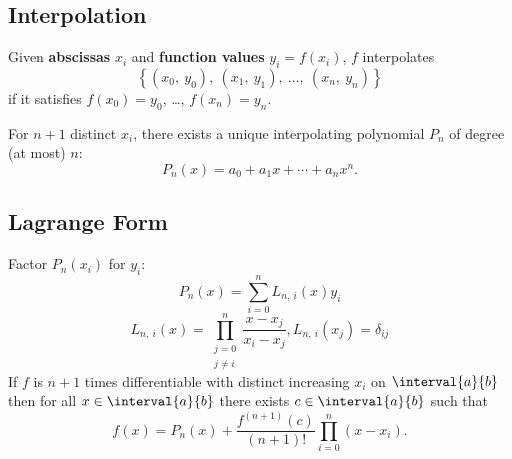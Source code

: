 \documentclass{article}
\begin{document}
\begin{multicols}{3}
    \section{Interpolation}
    Given \textbf{abscissas} \(x_i\) and \textbf{function values} \(y_i = f\left( x_i \right)\),
    \(f\) interpolates
    \begin{equation*}
        \left\{ \left( x_0,\: y_0 \right),\: \left( x_1,\: y_1 \right),\: \dots,\: \left( x_n,\: y_n \right) \right\}
    \end{equation*}
    if it satisfies \(f\left( x_0 \right) = y_0\), \dots,  \(f\left( x_n \right) = y_n\).

    For \(n + 1\) distinct \(x_i\), there exists a unique interpolating polynomial \(P_n\) of degree (at most) \(n\):
    \begin{equation*}
        P_n\left( x \right) = a_0 + a_1 x + \cdots + a_n x^n.
    \end{equation*}
    \subsection{Lagrange Form}
    Factor \(P_n\left( x_i \right)\) for \(y_i\):
    \begin{equation*}
        P_n\left( x \right) = \sum_{i = 0}^n L_{n,\: i}\left( x \right) y_i
    \end{equation*}
    \begin{equation*}
        L_{n,\: i}\left( x \right) = \prod_{\substack{j = 0 \\ j \neq i}}^n \frac{x - x_j}{x_i - x_j}, L_{n,\: i}\left( x_j \right) = \delta_{ij}
    \end{equation*}
    If \(f\) is \(n + 1\) times differentiable with distinct increasing \(x_i\) on \(\interval{a}{b}\)
    then for all \(x \in \interval{a}{b}\) there exists \(c \in \interval{a}{b}\) such that
    \begin{equation*}
        f\left( x \right) = P_n\left( x \right) + \frac{f^{\left( n + 1 \right)} \left( c \right)}{\left( n + 1 \right)!} \prod_{i = 0}^n \left( x - x_i \right).
    \end{equation*}

\end{multicols}
\end{document}
